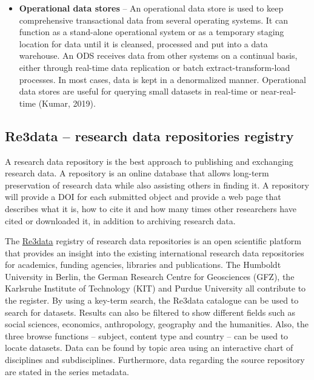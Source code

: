 \documentclass[
]{book}
\begin{document}
\begin{itemize}
\item
  \textbf{Operational data stores} -- An operational data store is used to keep comprehensive transactional data from several operating systems. It can function as a stand-alone operational system or as a temporary staging location for data until it is cleansed, processed and put into a data warehouse. An ODS receives data from other systems on a continual basis, either through real-time data replication or batch extract-transform-load processes. In most cases, data is kept in a denormalized manner. Operational data stores are useful for querying small datasets in real-time or near-real-time (Kumar, 2019).
\end{itemize}

\hypertarget{re3data-research-data-repositories-registry}{%
\subsection*{Re3data -- research data repositories registry}\label{re3data-research-data-repositories-registry}}

A research data repository is the best approach to publishing and exchanging research data. A repository is an online database that allows long-term preservation of research data while also assisting others in finding it. A repository will provide a DOI for each submitted object and provide a web page that describes what it is, how to cite it and how many times other researchers have cited or downloaded it, in addition to archiving research data.

The \href{https://www.re3data.org/}{Re3data} registry of research data repositories is an open scientific platform that provides an insight into the existing international research data repositories for academics, funding agencies, libraries and publications. The Humboldt University in Berlin, the German Research Centre for Geosciences (GFZ), the Karlsruhe Institute of Technology (KIT) and Purdue University all contribute to the register. By using a key-term search, the Re3data catalogue can be used to search for datasets. Results can also be filtered to show different fields such as social sciences, economics, anthropology, geography and the humanities. Also, the three browse functions -- subject, content type and country -- can be used to locate datasets. Data can be found by topic area using an interactive chart of disciplines and subdisciplines. Furthermore, data regarding the source repository are stated in the series metadata.
\end{document}
